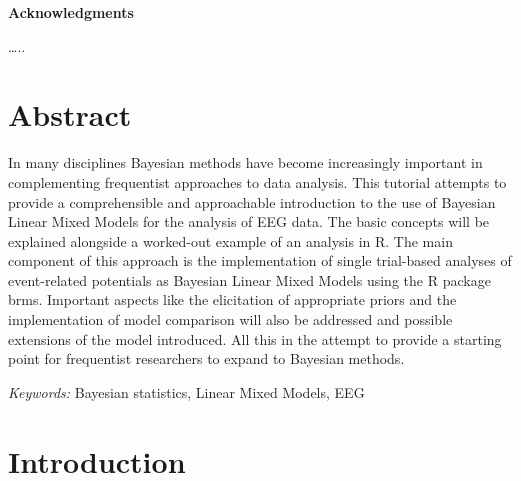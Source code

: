 \documentclass[
  doc,12pt,floatsintext]{apa7}
\begin{document}
\clearpage

\mbox{}\thispagestyle{empty}\clearpage

\newpage

\thispagestyle{empty}

\vspace*{55mm}

\begin{center}\textbf{Acknowledgments}\end{center}

\ldots..

\clearpage

\mbox{}\thispagestyle{empty}\clearpage

\thispagestyle{empty}

\vspace*{10mm}

\begin{flushleft}
{
\tableofcontents
}
\end{flushleft}

\newpage

\setcounter{page}{5}

\section*{Abstract}\label{abstract}

\noindent In many disciplines Bayesian methods have become increasingly important in complementing frequentist approaches to data analysis. This tutorial attempts to provide a comprehensible and approachable introduction to the use of Bayesian Linear Mixed Models for the analysis of EEG data. The basic concepts will be explained alongside a worked-out example of an analysis in R. The main component of this approach is the implementation of single trial-based analyses of event-related potentials as Bayesian Linear Mixed Models using the R package brms. Important aspects like the elicitation of appropriate priors and the implementation of model comparison will also be addressed and possible extensions of the model introduced. All this in the attempt to provide a starting point for frequentist researchers to expand to Bayesian methods.

\emph{Keywords:} Bayesian statistics, Linear Mixed Models, EEG

\newpage

\section{Introduction}\label{introduction}
\end{document}
